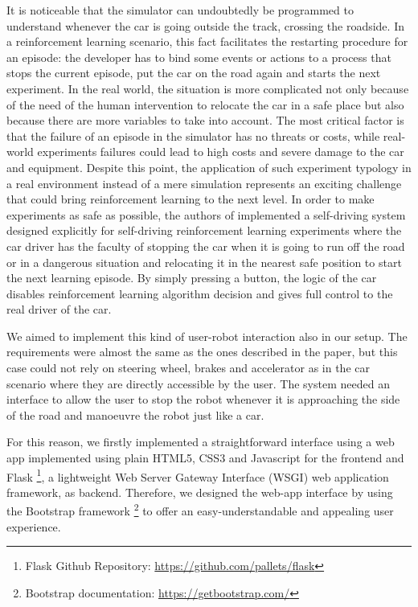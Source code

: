It is noticeable that the simulator can undoubtedly be programmed to understand whenever the car is going outside the track, crossing the roadside. In a reinforcement learning scenario, this fact facilitates the restarting procedure for an episode: the developer has to bind some events or actions to a process that stops the current episode, put the car on the road again and starts the next experiment. In the real world, the situation is more complicated not only because of the need of the human intervention to relocate the car in a safe place but also because there are more variables to take into account. The most critical factor is that the failure of an episode in the simulator has no threats or costs, while real-world experiments failures could lead to high costs and severe damage to the car and equipment. Despite this point, the application of such experiment typology in a real environment instead of a mere simulation represents an exciting challenge that could bring reinforcement learning to the next level. In order to make experiments as safe as possible, the authors of \cite{kendall2018learning,kendall2019learning} implemented a self-driving system designed explicitly for self-driving reinforcement learning experiments where the car driver has the faculty of stopping the car when it is going to run off the road or in a dangerous situation and relocating it in the nearest safe position to start the next learning episode. By simply pressing a button, the logic of the car disables reinforcement learning algorithm decision and gives full control to the real driver of the car.

We aimed to implement this kind of user-robot interaction also in our setup. The requirements were almost the same as the ones described in the paper, but this case could not rely on steering wheel, brakes and accelerator as in the car scenario where they are directly accessible by the user. The system needed an interface to allow the user to stop the robot whenever it is approaching the side of the road and manoeuvre the robot just like a car.

For this reason, we firstly implemented a straightforward interface using a web app implemented using plain HTML5, CSS3 and Javascript for the frontend and Flask \footnote{Flask Github Repository: \href{https://github.com/pallets/flask}{https://github.com/pallets/flask}}, a lightweight Web Server Gateway Interface (WSGI) web application framework, as backend.
Therefore, we designed the web-app interface by using the Bootstrap framework \footnote{Bootstrap documentation: \href{https://getbootstrap.com/}{https://getbootstrap.com/}} to offer an easy-understandable and appealing user experience.

